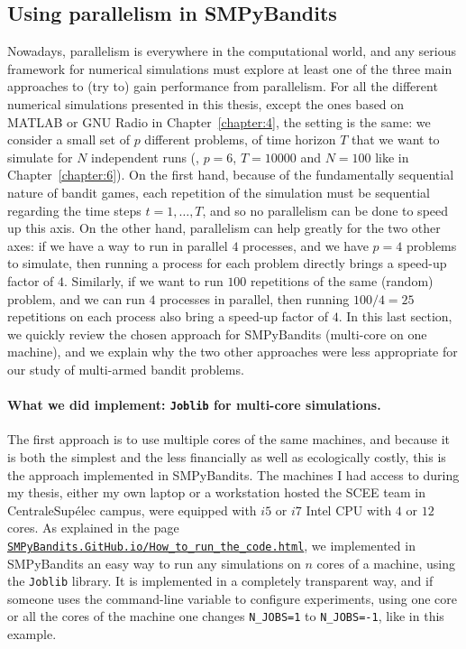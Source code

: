 \subsection{Using parallelism in SMPyBandits}
\label{sub:3:parallelSimulations}

Nowadays, parallelism is everywhere in the computational world, and any serious framework for numerical simulations must explore at least one of the three main approaches to (try to) gain performance from parallelism.
%
For all the different numerical simulations presented in this thesis, except the ones based on MATLAB or GNU Radio in Chapter~\ref{chapter:4}, the setting is the same: we consider a small set of $p$ different problems, of time horizon $T$ that we want to simulate for $N$ independent runs (\eg, $p=6$, $T=10000$ and $N=100$ like in Chapter~\ref{chapter:6}).
On the first hand, because of the fundamentally sequential nature of bandit games, each repetition of the simulation must be sequential regarding the time steps $t=1,\dots,T$, and so no parallelism can be done to speed up this axis.
On the other hand, parallelism can help greatly for the two other axes: if we have a way to run in parallel $4$ processes, and we have $p=4$ problems to simulate, then running a process for each problem directly brings a speed-up factor of $4$.
Similarly, if we want to run $100$ repetitions of the same (random) problem, and we can run $4$ processes in parallel, then running $100/4=25$ repetitions on each process also bring a speed-up factor of $4$.
%
In this last section, we quickly review the chosen approach for SMPyBandits (multi-core on one machine), and we explain why the two other approaches were less appropriate for our study of multi-armed bandit problems.

\paragraph{What we did implement: \texttt{Joblib} for multi-core simulations.}
%
The first approach is to use multiple cores of the same machines, and because it is both the simplest and the less financially as well as ecologically costly, this is the approach implemented in SMPyBandits.
The machines I had access to during my thesis, either my own laptop or a workstation hosted the SCEE team in CentraleSupélec campus, were equipped with $i5$ or $i7$ Intel CPU with $4$ or $12$ cores.
%
As explained in the page \href{https://smpybandits.github.io/How_to_run_the_code.html}{\texttt{SMPyBandits.GitHub.io/How\_to\_run\_the\_code.html}}, we implemented in SMPyBandits an easy way to run any simulations on $n$ cores of a machine, using the \texttt{Joblib} \cite{joblib} library.
It is implemented in a completely transparent way, and if someone uses the command-line variable to configure experiments, using one core or all the cores of the machine one changes \texttt{N\_JOBS=1} to \texttt{N\_JOBS=-1}, like in this example.


